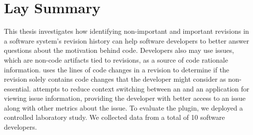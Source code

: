 

\chapter{Lay Summary}

This thesis investigates how identifying non-important and important 
revisions in a software system's revision history can help 
software developers to better answer questions about the motivation behind code.
Developers also may use issues, which are non-code artifacts tied to revisions, 
as a source of code rationale information.
 uses the lines of code changes in a revision
to determine if the revision solely contains code changes that the developer
might consider as non-essential.
 attempts to reduce context switching between an 
and an application for viewing issue information, providing the developer with
better access to an issue along with other metrics about the issue.
To evaluate the plugin, we deployed a controlled laboratory study.
We collected data from a total of 10 software developers.